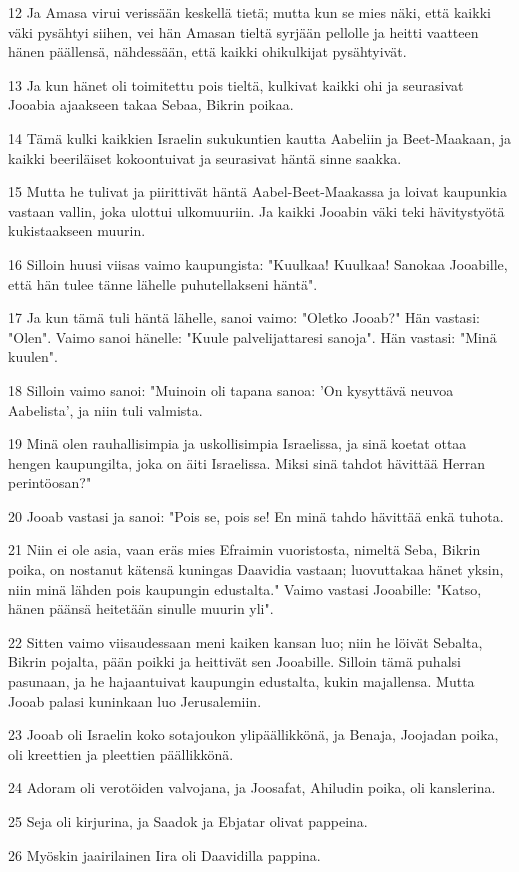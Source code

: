 \par 12 Ja Amasa virui verissään keskellä tietä; mutta kun se mies näki, että kaikki väki pysähtyi siihen, vei hän Amasan tieltä syrjään pellolle ja heitti vaatteen hänen päällensä, nähdessään, että kaikki ohikulkijat pysähtyivät.
\par 13 Ja kun hänet oli toimitettu pois tieltä, kulkivat kaikki ohi ja seurasivat Jooabia ajaakseen takaa Sebaa, Bikrin poikaa.
\par 14 Tämä kulki kaikkien Israelin sukukuntien kautta Aabeliin ja Beet-Maakaan, ja kaikki beeriläiset kokoontuivat ja seurasivat häntä sinne saakka.
\par 15 Mutta he tulivat ja piirittivät häntä Aabel-Beet-Maakassa ja loivat kaupunkia vastaan vallin, joka ulottui ulkomuuriin. Ja kaikki Jooabin väki teki hävitystyötä kukistaakseen muurin.
\par 16 Silloin huusi viisas vaimo kaupungista: "Kuulkaa! Kuulkaa! Sanokaa Jooabille, että hän tulee tänne lähelle puhutellakseni häntä".
\par 17 Ja kun tämä tuli häntä lähelle, sanoi vaimo: "Oletko Jooab?" Hän vastasi: "Olen". Vaimo sanoi hänelle: "Kuule palvelijattaresi sanoja". Hän vastasi: "Minä kuulen".
\par 18 Silloin vaimo sanoi: "Muinoin oli tapana sanoa: 'On kysyttävä neuvoa Aabelista', ja niin tuli valmista.
\par 19 Minä olen rauhallisimpia ja uskollisimpia Israelissa, ja sinä koetat ottaa hengen kaupungilta, joka on äiti Israelissa. Miksi sinä tahdot hävittää Herran perintöosan?"
\par 20 Jooab vastasi ja sanoi: "Pois se, pois se! En minä tahdo hävittää enkä tuhota.
\par 21 Niin ei ole asia, vaan eräs mies Efraimin vuoristosta, nimeltä Seba, Bikrin poika, on nostanut kätensä kuningas Daavidia vastaan; luovuttakaa hänet yksin, niin minä lähden pois kaupungin edustalta." Vaimo vastasi Jooabille: "Katso, hänen päänsä heitetään sinulle muurin yli".
\par 22 Sitten vaimo viisaudessaan meni kaiken kansan luo; niin he löivät Sebalta, Bikrin pojalta, pään poikki ja heittivät sen Jooabille. Silloin tämä puhalsi pasunaan, ja he hajaantuivat kaupungin edustalta, kukin majallensa. Mutta Jooab palasi kuninkaan luo Jerusalemiin.
\par 23 Jooab oli Israelin koko sotajoukon ylipäällikkönä, ja Benaja, Joojadan poika, oli kreettien ja pleettien päällikkönä.
\par 24 Adoram oli verotöiden valvojana, ja Joosafat, Ahiludin poika, oli kanslerina.
\par 25 Seja oli kirjurina, ja Saadok ja Ebjatar olivat pappeina.
\par 26 Myöskin jaairilainen Iira oli Daavidilla pappina.

